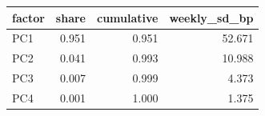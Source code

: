 
\begin{tabular}{lrrr}
\toprule
factor & share & cumulative & weekly\_sd\_bp\\
\midrule
PC1 & 0.951 & 0.951 & 52.671\\
PC2 & 0.041 & 0.993 & 10.988\\
PC3 & 0.007 & 0.999 & 4.373\\
PC4 & 0.001 & 1.000 & 1.375\\
\bottomrule
\end{tabular}
